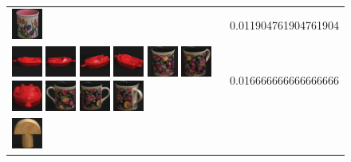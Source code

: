 \begin{figure}[tbp]
\begin{center}
\begin{tabular}{m{11cm} | m{3cm} |}
\includegraphics[width=1cm]{coil/beeld-8.eps} & {\scriptsize 
0.011904761904761904} \\ \includegraphics[width=1cm]{coil/beeld-18.eps} 
\includegraphics[width=1cm]{coil/beeld-19.eps} 
\includegraphics[width=1cm]{coil/beeld-21.eps} 
\includegraphics[width=1cm]{coil/beeld-22.eps} 
\includegraphics[width=1cm]{coil/beeld-62.eps} 
\includegraphics[width=1cm]{coil/beeld-63.eps} 
\includegraphics[width=1cm]{coil/beeld-20.eps} 
\includegraphics[width=1cm]{coil/beeld-61.eps} 
\includegraphics[width=1cm]{coil/beeld-60.eps} 
\includegraphics[width=1cm]{coil/beeld-64.eps} & {\scriptsize 
0.016666666666666666} \\ \includegraphics[width=1cm]{coil/beeld-0.eps} 

\end{tabular}
\end{center}
\end{figure}
